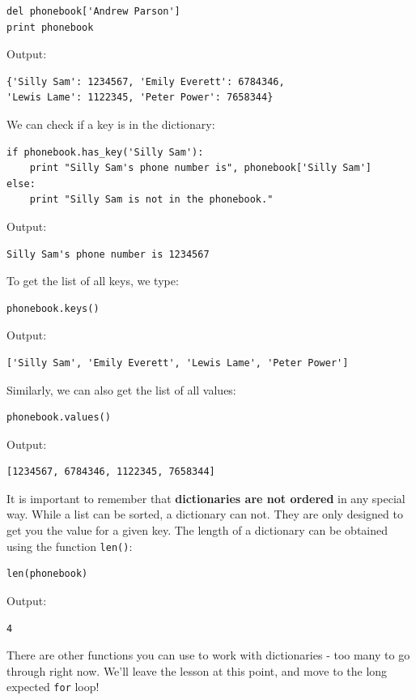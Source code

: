 \begin{verbatim}
del phonebook['Andrew Parson']
print phonebook
\end{verbatim}
Output:

\begin{verbatim}
{'Silly Sam': 1234567, 'Emily Everett': 6784346, 
'Lewis Lame': 1122345, 'Peter Power': 7658344}
\end{verbatim}
We can check if a key is in the dictionary:

\begin{verbatim}
if phonebook.has_key('Silly Sam'):
    print "Silly Sam's phone number is", phonebook['Silly Sam']
else:
    print "Silly Sam is not in the phonebook."
\end{verbatim}
Output:

\begin{verbatim}
Silly Sam's phone number is 1234567
\end{verbatim}
To get the list of all keys, we type:

\begin{verbatim}
phonebook.keys()
\end{verbatim}
Output:

\begin{verbatim}
['Silly Sam', 'Emily Everett', 'Lewis Lame', 'Peter Power']
\end{verbatim}
Similarly, we can also get the list of all values:

\begin{verbatim}
phonebook.values()
\end{verbatim}
Output:

\begin{verbatim}
[1234567, 6784346, 1122345, 7658344]
\end{verbatim}
It is important to remember that {\bf dictionaries are not ordered} in any 
special way. While a list can be sorted, a dictionary can not. They are only 
designed to get you the value for a given key. 
The length of a dictionary can be obtained using the function {\tt len()}:

\begin{verbatim}
len(phonebook)
\end{verbatim}
Output:

\begin{verbatim}
4
\end{verbatim}
There are other functions you can use to work with dictionaries - too many to go 
through right now. We'll leave the lesson at this point, and move to the long 
expected {\tt for} loop!

